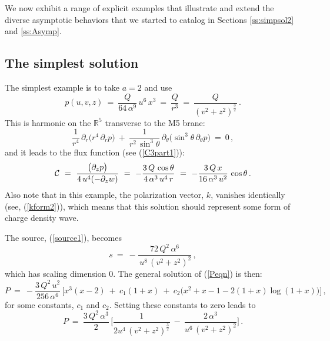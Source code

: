 \documentclass[11pt]{article}
\def\IR{\mathbb{R}}
\def\cC{{\cal C}}
\numberwithin{equation}{section}
\begin{document}
We now exhibit a range of explicit examples that illustrate and extend the diverse  asymptotic behaviors that we started to catalog in Sections \ref{ss:simpsol2} and \ref{ss:Asymp}.


\subsection{The simplest solution}
\label{ss:example1}

The  simplest  example is to take $a=2$ and use 
%
\begin{equation}
p(u,v,z)  ~=~ \frac{Q}{64\, \alpha^9} \, u^{6} \, x^3  ~=~ \frac{Q  }{r^3}  ~=~ \frac{Q}{(v^2 +z^2)^{\frac{3}{2}}}   \,.
\label{pAnsatz3}
\end{equation}
%
This is harmonic on the $\IR^5$ transverse to the M5 brane:
%
\begin{equation}
 \frac{1}{r^4} \, \partial_r  \big(r^ 4\, \partial_r p \big)  ~+~\frac{1}{r^2 \, \sin^3 \theta } \, \partial_\theta \big(\sin^3 \theta \, \partial_\theta p \big) ~=~ 0 \,,
 \label{peqn-simp2}
\end{equation}
%
and it leads to the flux function (see (\ref{C3part1})): 
% 
\begin{equation}
\cC ~=~   \frac{\big( \partial_z p \big) }  {4\, u^4  (-\partial_z w)}   ~=~  - \frac{3\, Q\, \cos \theta }{4\, \alpha^3 \, u^4 \, r} ~=~  - \frac{3\, Q\, x }{16\, \alpha^3 \, u^2} \,  \cos \theta \,.
 \label{C3part3}
\end{equation}
%
Also note that in this example, the polarization vector, $k$, vanishes identically (see, (\ref{kform2})), which means that this solution should represent some form of charge density wave.

The source, (\ref{source1}), becomes
%
\begin{equation}
s  ~=~  -\frac{72\, Q^2\, \alpha^6}{\,u^8 \, (v^2 +z^2)^{2} }\,,
\label{source-simp1}
\end{equation}
%
which has scaling dimension $0$.  
The general  solution of (\ref{Peqn}) is then:
%
\begin{equation}
P  ~=~-\frac{3\,Q^2\, u^2}{256\,\alpha^6} \,\Big[x^3(x -2 ) ~+~c_1 (1+x) ~+~c_2 \big(x^2 + x-  1 - 2(1+x)\log (1+x)\big)  \Big]\,,
\label{Ppart1}
\end{equation}
%
for some constants, $c_1$ and $c_2$. Setting these constants to zero leads to
%
\begin{equation}
P  ~=~\frac{3\,Q^2\,\alpha^3}{2} \, \bigg[  \frac{1}{2 u^4 \, (v^2 +z^2)^{\frac{3}{2} } } ~-~  \frac{2\,  \alpha^3}{u^6 \, (v^2 +z^2)^{2} } \bigg]  \,.
\label{Ppart2}
\end{equation}
%
\end{document}
